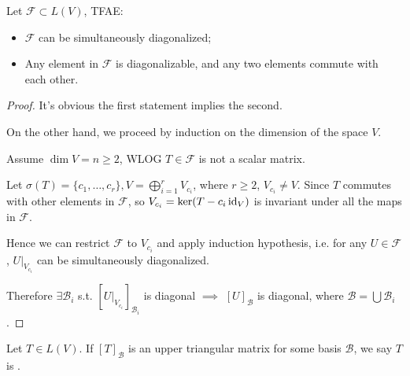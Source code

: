 \begin{proposition}
	Let $\mathcal{F} \subset L(V)$, TFAE:
	\begin{itemize}
		\item $\mathcal{F}$ can be simultaneously diagonalized;
		\item Any element in $\mathcal{F}$ is diagonalizable, and any two elements
			commute with each other.
	\end{itemize}
\end{proposition}
\begin{proof}[Proof]
    It's obvious the first statement implies the second.

	On the other hand, we proceed by induction on the dimension of the space $V$.

	Assume  $\dim V = n\ge 2$, WLOG $T\in \mathcal{F}$ is not a scalar matrix.

	Let $\sigma(T)=\{c_1,\dots,c_r\}, V=\bigoplus_{i=1}^r V_{c_i}$, where $r\ge 2$,
	$V_{c_i}\ne V$.
	Since $T$ commutes with other elements in  $\mathcal{F}$,
	so $V_{c_i} = \ker(T - c_i\operatorname{id}_V)$ is invariant under all the maps in $\mathcal{F}$.

	Hence we can restrict $\mathcal{F}$ to $V_{c_i}$ and apply
	induction hypothesis, i.e. for any $U\in \mathcal{F}$, $U|_{V_{c_i}}$ can
	be simultaneously diagonalized.

	Therefore $\exists \mathcal{B}_i$ s.t. $[U|_{V_{c_i}}]_{\mathcal{B}_i}$ is diagonal
	$\implies$  $[U]_{\mathcal{B}}$ is diagonal, where $\mathcal{B}=\bigcup \mathcal{B}_i$.
\end{proof}

\begin{definition}
	Let $T\in L(V)$. If $[T]_{\mathcal{B}}$ is an upper
	triangular matrix for some basis $\mathcal{B}$,
	we say $T$ is .
\end{definition}

